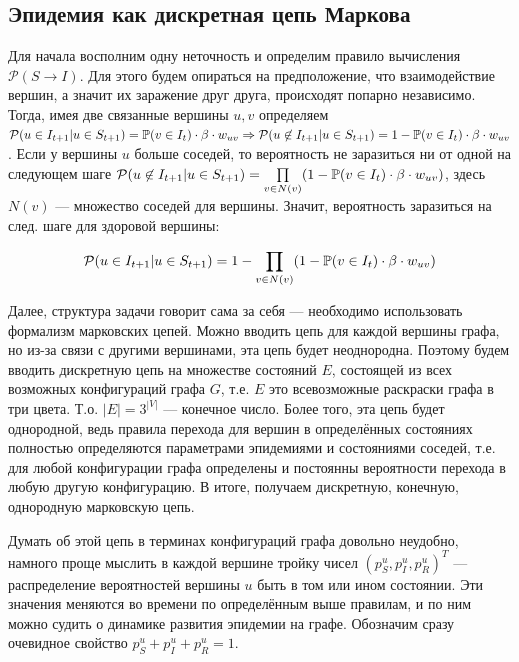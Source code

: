 	\subsection*{Эпидемия как дискретная цепь Маркова}
	
	Для начала восполним одну неточность и определим правило вычисления $\mathcal{P}(S \rightarrow I)$. Для этого будем опираться на предположение, что взаимодействие вершин, а значит их заражение друг друга, происходят попарно независимо. Тогда, имея две связанные вершины $u, v$ определяем $\mathcal{P}(u \in I_{t+1} | u \in S_{t+1}) = \mathbb{P}(v \in I_t) \cdot \beta \cdot w_{uv} \Rightarrow \mathcal{P}(u \not \in I_{t+1} | u \in S_{t+1}) = 1 - \mathbb{P}(v \in I_t) \cdot \beta \cdot w_{uv} $. Если у вершины $u$ больше соседей, то вероятность не заразиться ни от одной на следующем шаге $\mathcal{P}(u \not \in I_{t+1} | u \in S_{t+1}) = \prod\limits_{v \in N(v)} (1 - \mathbb{P}(v \in I_t) \cdot \beta \cdot w_{uv}) $, здесь $N(v)$ --- множество соседей для вершины. Значит, вероятность заразиться на след. шаге для здоровой вершины:
	
	\begin{equation*}
		\mathcal{P}(u \in I_{t+1} | u \in S_{t+1}) = 1 - \prod\limits_{v \in N(v)} (1 - \mathbb{P}(v \in I_t) \cdot \beta \cdot w_{uv})
	\end{equation*}
	
	Далее, структура задачи говорит сама за себя --- необходимо использовать формализм марковских цепей. Можно вводить цепь для каждой вершины графа, но из-за связи с другими вершинами, эта цепь будет неоднородна. Поэтому будем вводить дискретную цепь на множестве состояний $E$, состоящей из всех возможных конфигураций графа $G$, т.е. $E$ это всевозможные раскраски графа в три цвета. Т.о. $ \lvert E \rvert = 3^{|V|} $ --- конечное число. Более того, эта цепь будет однородной, ведь правила перехода для вершин в определённых состояниях полностью определяются параметрами эпидемиями и состояниями соседей, т.е. для любой конфигурации графа определены и постоянны вероятности перехода в любую другую конфигурацию. В итоге, получаем дискретную, конечную, однородную марковскую цепь.
	
	Думать об этой цепь в терминах конфигураций графа довольно неудобно, намного проще мыслить в каждой вершине тройку чисел $(p_S^u, p_I^u, p_R^u)^T$ --- \hypertarget{ver_distr}{распределение вероятностей} вершины $u$ быть в том или ином состоянии. Эти значения меняются во времени по определённым выше правилам, и по ним можно судить о динамике развития эпидемии на графе. Обозначим сразу очевидное свойство $p_S^u + p_I^u + p_R^u = 1$.
	
